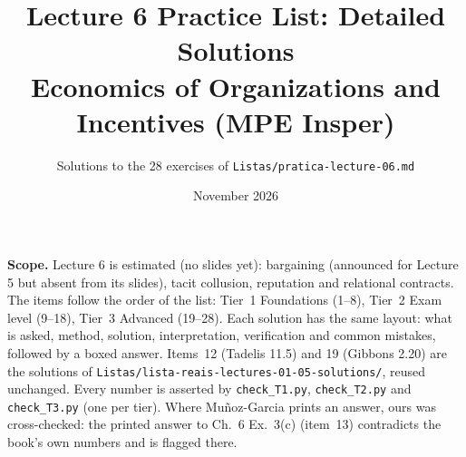 \documentclass[11pt,a4paper]{article}
\title{\textbf{Lecture 6 Practice List: Detailed Solutions}\\[4pt]
  \large Economics of Organizations and Incentives (MPE Insper)}
\author{Solutions to the 28 exercises of \texttt{Listas/pratica-lecture-06.md}}
\date{November 2026}
\begin{document}
\maketitle
\thispagestyle{empty}

\noindent\textbf{Scope.} Lecture 6 is estimated (no slides yet): bargaining (announced for Lecture 5 but absent from
its slides), tacit collusion, reputation and relational contracts. The items follow the order of the list: Tier~1
Foundations (1--8), Tier~2 Exam level (9--18), Tier~3 Advanced (19--28). Each solution has the same layout: what is
asked, method, solution, interpretation, verification and common mistakes, followed by a boxed answer.
Items~12 (Tadelis 11.5) and 19 (Gibbons 2.20) are the solutions of
\texttt{Listas/lista-reais-lectures-01-05-solutions/}, reused unchanged. Every number is asserted by
\texttt{check\_T1.py}, \texttt{check\_T2.py} and \texttt{check\_T3.py} (one per tier). Where
Mu\~noz-Garcia prints an answer, ours was cross-checked: the printed answer to Ch.~6 Ex.~3(c) (item~13)
contradicts the book's own numbers and is flagged there.

\tableofcontents

\tieri
{}
\tierii
{}
\tieriii
\end{document}
